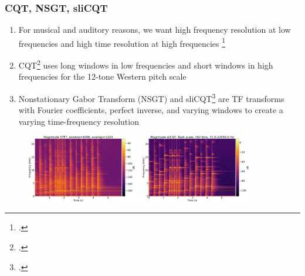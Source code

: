 \documentclass[usenames,dvipsnames]{beamer}
\begin{document}
\begin{frame}
	\frametitle{CQT, NSGT, sliCQT}
	\begin{enumerate}
	\item
		For musical and auditory reasons, we want high frequency resolution at low frequencies and high time resolution at high frequencies \footcite{doerflerphd}
	\item
		CQT\footcite{jbrown} uses long windows in low frequencies and short windows in high frequencies for the 12-tone Western pitch scale
	\item
		Nonstationary Gabor Transform (NSGT) and sliCQT\footcite{balazs, slicq} are TF transforms with Fourier coefficients, perfect inverse, and varying windows to create a varying time-frequency resolution
	\end{enumerate}
	\begin{figure}[ht]
		\centering
		\vspace{-0.75em}
		\includegraphics[height=3cm]{./images-mml-presentation/spectrograms_comparison.png}
	\end{figure}
\end{frame}
\end{document}

